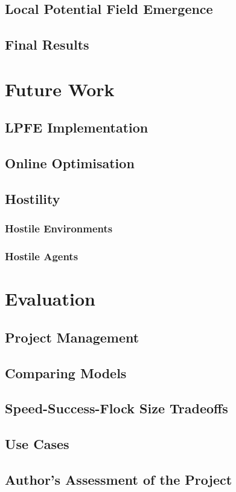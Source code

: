 \documentclass[12pt]{article}
\begin{document}
\subsection{Local Potential Field Emergence}
\label{sec:lpfe}

\subsection{Final Results}




\section{Future Work}
\subsection{LPFE Implementation}

\subsection{Online Optimisation}

\subsection{Hostility}
\subsubsection{Hostile Environments}

\subsubsection{Hostile Agents}


\section{Evaluation}
\subsection{Project Management}

\subsection{Comparing Models}

\subsection{Speed-Success-Flock Size Tradeoffs}

\subsection{Use Cases}

\subsection{Author's Assessment of the Project}




\newpage

 
\end{document}

